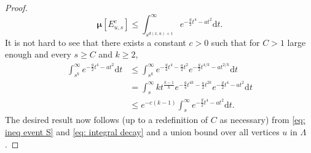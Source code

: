 \documentclass[11pt,a4paper]{article}
\theoremstyle{definition}
\numberwithin{equation}{section}
\begin{document}
\begin{proof}
\begin{equation}\label{eq: ineq event S}
\boldsymbol\mu[E_{u,s}^c]\leq \int_{s^{d(x,u)+1}}^\infty e^{-\frac{g}{2}t^4-at^2}\mathrm{d}t.
\end{equation}
It is not hard to see that there exists a constant $c>0$ such that for $C>1$ large enough and every $s\geq C$ and $k\geq 2$,
\begin{equation}\label{eq: integral decay}
\begin{aligned}
 \int_{s^k}^\infty e^{-\frac{g}{2}t^4-at^2}\mathrm{d}t &\leq  \int_{s^k}^\infty e^{-\frac{g}{4}t^4-\frac{a}{2}t^2}e^{-\frac{g}{2}t^{4/k}-at^{2/k}}\mathrm{d}t \\ 
 &=\int_{s}^\infty k t^{\frac{k-1}{k}} e^{-\frac{g}{4}t^{4k}-\frac{a}{2}t^{2k}}e^{-\frac{g}{2}t^{4}-at^{2}}\mathrm{d}t \\
 &\leq e^{-c(k-1)}\int_{s}^\infty e^{-\frac{g}{2}t^4-at^2}\mathrm{d}t.
 \end{aligned}
\end{equation}
The desired result now follows (up to a redefinition of $C$ as necessary) from \eqref{eq: ineq event S} and \eqref{eq: integral decay} and a union bound over all vertices $u$ in $\Lambda$.
\end{proof}
\end{document}
